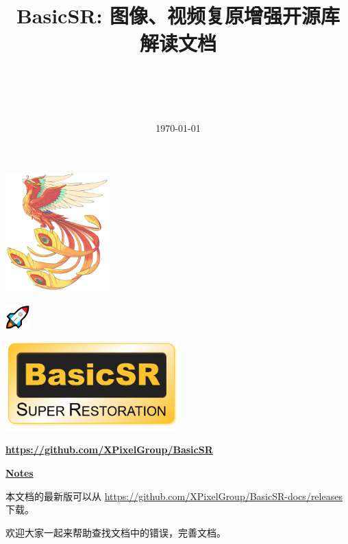 \documentclass[a4paper, 12pt, oneside]{memoir}
\title{
	\vspace{4cm}
	\normalfont \normalsize
	\horrule{0.5pt} \\[0.4cm]
	\huge \begin{CJK}{UTF8}{gbsn} BasicSR: 图像、视频复原增强开源库
		\\ 解读文档\end{CJK}
	\horrule{2pt} \\[0.5cm]
}
\date{\normalsize\today}
\begin{document}
	\maketitle
	\thispagestyle{empty}

	\vspace{-14.5cm}
	\begin{adjustwidth}{0.5cm}{}
		\hspace{5.5cm}
		\includegraphics[width=0.3\textwidth]{figures/xpixel-logo.jpg}
	\end{adjustwidth}
	\vspace{1.2cm}
	\begin{adjustwidth}{0.5cm}{}
		\includegraphics[width=0.07\textwidth]{figures/rocket_logo.png}
	\end{adjustwidth}
	\vspace{5cm}

	\begin{center}
		\includegraphics[width=0.5\textwidth]{figures/basicsr_logo.png}
	\end{center}
	\begin{center}
		\underline{\textbf{\url{https://github.com/XPixelGroup/BasicSR}}}
	\end{center}

	\vspace{2.2cm}
	\begin{center}
		\textcolor{ChadBlue}{\underline{\textbf{Notes}}}
	\end{center}
	\vspace{0.5cm}
	\begin{CJK}{UTF8}{gbsn}

		本文档的最新版可以从 \url{https://github.com/XPixelGroup/BasicSR-docs/releases} 下载。

		欢迎大家一起来帮助查找文档中的错误，完善文档。
	\end{CJK}
\end{document}
